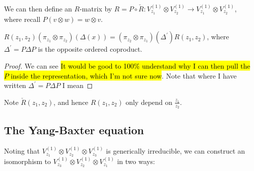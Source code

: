 \documentclass{article}
\begin{document}
We can then define an $R$-matrix by $R = P\circ \check{R} : V_{z_1}^{(1)} \otimes V_{z_2}^{(1)} \to V_{z_1}^{(1)} \otimes V_{z_2}^{(1)}$, where recall $P(v \otimes w) = w \otimes v$.  

\begin{prop}\label{prop:CQIS:introducinguniversalR}
$R(z_1, z_2)(\pi_{z_1} \otimes \pi_{z_2})(\Delta(x)) = (\pi_{z_2}\otimes \pi_{z_1})(\Delta^\prime) R(z_1, z_2)$, where $\Delta^\prime = P \Delta P$ is the opposite ordered coproduct.
\end{prop}
\begin{proof}
We can see 
\hl{It would be good to 100\% understand why I can then pull the $P$ inside the representation, which I'm not sure now}. Note that where I have written $\Delta^\prime = P\Delta P$ I mean 
\end{proof}

\begin{remark}
Note $\check{R}(z_1,z_2)$, and hence $R(z_1,z_2)$ only depend on $\frac{z_1}{z_2}$.
\end{remark}

\subsection{The Yang-Baxter equation}
Noting that $V_{z_1}^{(1)} \otimes V_{z_2}^{(1)} \otimes V_{z_3}^{(1)}$ is generically irreducible, we can construct an isomorphism to $V_{z_3}^{(1)} \otimes V_{z_2}^{(1)} \otimes V_{z_1}^{(1)}$ in two ways: 
\end{document}
